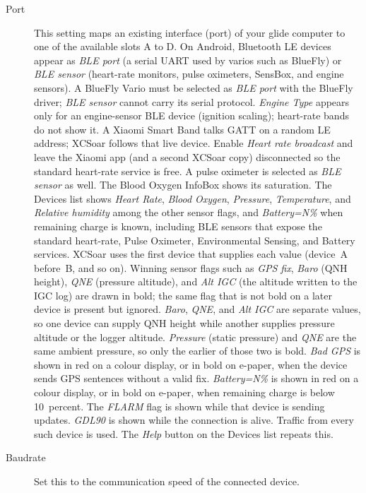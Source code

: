 \begin{description}
\item[Port]  This setting maps an existing interface (port) of your 
  glide computer to one of the available slots A to D.
  On Android, Bluetooth LE devices appear as {\it BLE port} (a
  serial UART used by varios such as BlueFly) or {\it BLE sensor}
  (heart-rate monitors, pulse oximeters, SensBox, and engine sensors).
  A BlueFly Vario must be selected as {\it BLE port} with the BlueFly
  driver; {\it BLE sensor} cannot carry its serial protocol.
  {\it Engine Type} appears only for an engine-sensor BLE device
  (ignition scaling); heart-rate bands do not show it.
  A Xiaomi Smart Band talks GATT on a random LE address; XCSoar
  follows that live device.  Enable {\it Heart rate broadcast} and
  leave the Xiaomi app (and a second XCSoar copy) disconnected so the
  standard heart-rate service is free.
  A pulse oximeter is selected as {\it BLE sensor} as well.  The
  Blood Oxygen InfoBox shows its saturation.
  The Devices list shows {\it Heart Rate}, {\it Blood Oxygen},
  {\it Pressure}, {\it Temperature}, and {\it Relative humidity}
  among the other sensor flags, and {\it Battery=N\%} when remaining
  charge is known, including BLE sensors that expose the standard
  heart-rate, Pulse Oximeter, Environmental Sensing, and Battery
  services.
  XCSoar uses the first device that supplies each value (device~A
  before~B, and so on).  Winning sensor flags such as {\it GPS fix},
  {\it Baro} (QNH height), {\it QNE} (pressure altitude), and
  {\it Alt IGC} (the altitude written to the IGC log) are
  drawn in bold; the same flag that is not bold on a later device is
  present but ignored.  {\it Baro}, {\it QNE}, and {\it Alt IGC} are
  separate values, so one device can supply QNH height while another
  supplies pressure altitude or the logger altitude.
  {\it Pressure} (static pressure) and {\it QNE} are the same ambient
  pressure, so only the earlier of those two is bold.
  {\it Bad GPS} is shown in red on a colour display, or in bold on
  e-paper, when the device sends GPS sentences without a valid fix.
  {\it Battery=N\%} is shown in red on a colour display, or in bold
  on e-paper, when remaining charge is below 10~percent.
  The {\it FLARM} flag is shown while that device is sending
  updates.
  {\it GDL90} is shown while the connection is alive.
  Traffic from every such device is used.
  The {\it Help} button on the Devices list repeats this.
\item[Baudrate]  Set this to the communication speed of the connected device.

\end{description}
